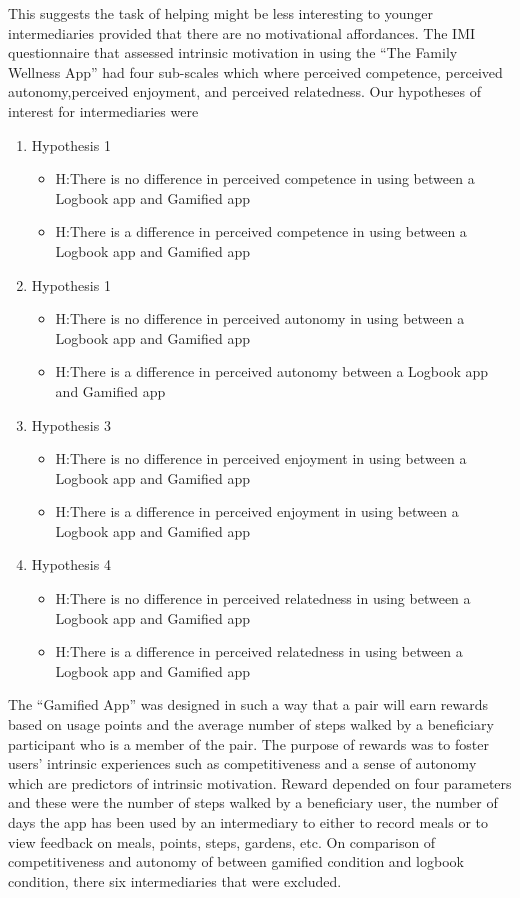 This suggests the task of helping might be less interesting to younger intermediaries provided that there are no motivational affordances.\newline
The IMI questionnaire that assessed intrinsic motivation in using the ``The Family Wellness App'' had four sub-scales which where perceived competence, perceived autonomy,perceived enjoyment, and perceived relatedness.  
Our hypotheses of interest for intermediaries were
\begin{enumerate}
\item{Hypothesis 1}
\begin{itemize}
\item{H}:There is no difference in perceived competence in using  between a Logbook app and Gamified app
\item{H}:There is a difference in perceived competence in using  between a Logbook app and Gamified app
\end{itemize}
\item{Hypothesis 1}
\begin{itemize}
\item{H}:There is no difference in perceived autonomy in using between a Logbook app and Gamified app
\item{H}:There is a difference in perceived autonomy between a Logbook app and Gamified app
\end{itemize}
\item{Hypothesis 3}
\begin{itemize}
\item{H}:There is no difference in perceived enjoyment in using  between a Logbook app and Gamified app
\item{H}:There is a difference in perceived enjoyment in using between a Logbook app and Gamified app
\end{itemize}
\item{Hypothesis 4}
\begin{itemize}
\item{H}:There is no difference in perceived relatedness in using between a Logbook app and Gamified app
\item{H}:There is a difference in perceived relatedness in using between a Logbook app and Gamified app
\end{itemize}
\end{enumerate}
The ``Gamified App'' was designed in such a way that a pair will earn rewards based on usage points and the average number of steps walked by a beneficiary participant who is a member of the pair. The purpose of rewards was to foster users' intrinsic experiences such as competitiveness and a sense of autonomy which are predictors of intrinsic motivation. Reward depended on four parameters and these were the number of steps walked by a beneficiary user, the number of days the app has been used by an intermediary to either to record meals or to view feedback on meals, points, steps, gardens, etc. On comparison of competitiveness and autonomy of between gamified condition and logbook condition, there six intermediaries that were excluded.\newline

